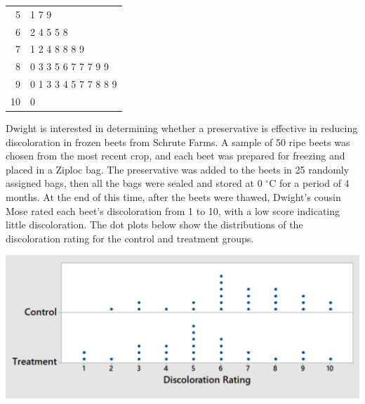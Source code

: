 \documentclass[noanswers]{exam}
\begin{document}
\begin{questions}
\begin{parts}
\begin{solution}[\stretch{3}]
			\begin{tabular}{r|l}
			5 & 1 7 9 \\
			6 & 2 4 5 5 8\\ 
			7 & 1 2 4 8 8 8 9\\
			8 & 0 3 3 5 6 7 7 7 9 9\\
			9 & 0 1 3 3 4 5 7 7 8 8 9\\
			10 & 0			
			\end{tabular}

			\vspace{3mm}		
			
		\end{solution}
	
	\end{parts}
	
	
	
	\newpage
	

\question Dwight is interested in determining whether a preservative is effective in reducing discoloration in frozen
beets from Schrute Farms. A sample of 50 ripe beets was chosen from the most recent crop, and each beet was prepared for freezing and placed in a Ziploc bag. The preservative was added to the beets in 25 randomly assigned bags, then all the bags were sealed and stored at 0 $^\circ$C for a period of 4 months. At the end of this time, after the beets were thawed, Dwight's cousin Mose rated each beet's discoloration from
1 to 10, with a low score indicating little discoloration. The dot plots below show the distributions of the discoloration rating for the control and treatment groups.
	
	\begin{center}
		\includegraphics[scale=.4]{STAT_3090_Ch3_dotplot.PNG}
	\end{center}
	
	\vspace{3mm}
	
\end{questions}
\end{document}
